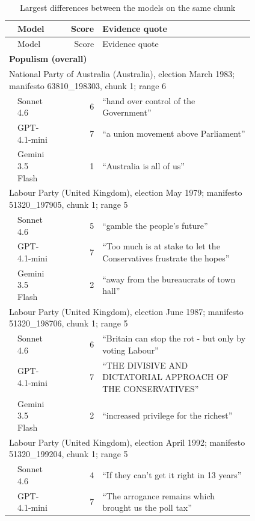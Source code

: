 {\footnotesize
\begin{longtable}{p{0.02\linewidth}p{0.17\linewidth}rp{0.62\linewidth}}
\caption{Largest differences between the models on the same chunk}\label{tab:oa10a} \\
\toprule
 & Model & Score & Evidence quote \\
\midrule
\endfirsthead
 & Model & Score & Evidence quote \\
\midrule
\endhead
\multicolumn{4}{l}{\textbf{Populism (overall)}} \\
\midrule
\multicolumn{4}{p{0.96\linewidth}}{National Party of Australia (Australia), election March 1983; manifesto 63810\_198303, chunk 1; range 6} \\
 & Sonnet 4.6 & 6 & ``hand over control of the Government'' \\
 & GPT-4.1-mini & 7 & ``a union movement above Parliament'' \\
 & Gemini 3.5 Flash & 1 & ``Australia is all of us'' \\
\midrule
\multicolumn{4}{p{0.96\linewidth}}{Labour Party (United Kingdom), election May 1979; manifesto 51320\_197905, chunk 1; range 5} \\
 & Sonnet 4.6 & 5 & ``gamble the people's future'' \\
 & GPT-4.1-mini & 7 & ``Too much is at stake to let the Conservatives frustrate the hopes'' \\
 & Gemini 3.5 Flash & 2 & ``away from the bureaucrats of town hall'' \\
\midrule
\multicolumn{4}{p{0.96\linewidth}}{Labour Party (United Kingdom), election June 1987; manifesto 51320\_198706, chunk 1; range 5} \\
 & Sonnet 4.6 & 6 & ``Britain can stop the rot - but only by voting Labour'' \\
 & GPT-4.1-mini & 7 & ``THE DIVISIVE AND DICTATORIAL APPROACH OF THE CONSERVATIVES'' \\
 & Gemini 3.5 Flash & 2 & ``increased privilege for the richest'' \\
\midrule
\multicolumn{4}{p{0.96\linewidth}}{Labour Party (United Kingdom), election April 1992; manifesto 51320\_199204, chunk 1; range 5} \\
 & Sonnet 4.6 & 4 & ``If they can't get it right in 13 years'' \\
 & GPT-4.1-mini & 7 & ``The arrogance remains which brought us the poll tax'' \\

\end{longtable}}

